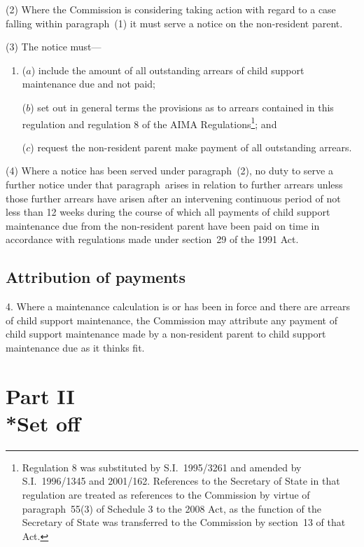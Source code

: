 \documentclass[12pt,a4paper]{article}
\begin{document}
(2) Where the Commission is considering taking action with regard to a case falling within paragraph~(1) it must serve a notice on the non-resident parent.

(3) The notice must—
\begin{enumerate}\item[]

($a$) include the amount of all outstanding arrears of child support maintenance due and not paid;

($b$) set out in general terms the provisions as to arrears contained in this regulation and regulation 8 of the AIMA Regulations\footnote{Regulation 8 was substituted by S.I.~1995/3261 and amended by S.I.~1996/1345 and 2001/162. References to the Secretary of State in that regulation are treated as references to the Commission by virtue of paragraph~55(3) of Schedule 3 to the 2008 Act, as the function of the Secretary of State was transferred to the Commission by section~13 of that Act.}; and

($c$) request the non-resident parent make payment of all outstanding arrears.
\end{enumerate}

(4) Where a notice has been served under paragraph~(2), no duty to serve a further notice under that paragraph~arises in relation to further arrears unless those further arrears have arisen after an intervening continuous period of not less than 12 weeks during the course of which all payments of child support maintenance due from the non-resident parent have been paid on time in accordance with regulations made under section~29 of the 1991 Act.


\subsection[4. Attribution of payments]{Attribution of payments}

4.  Where a maintenance calculation is or has been in force and there are arrears of child support maintenance, the Commission may attribute any payment of child support maintenance made by a non-resident parent to child support maintenance due as it thinks fit.

\section[Part II --- Set off]{Part II\\*Set off}
\end{document}
